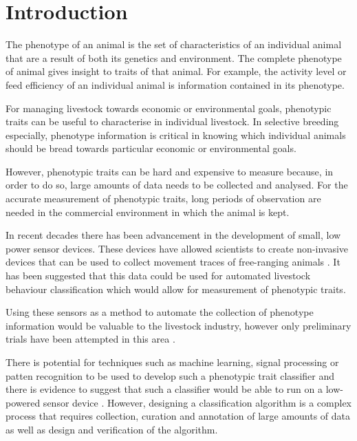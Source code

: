 \chapter{Introduction}

The phenotype of an animal is the set of characteristics of an individual animal that are a result of both its genetics and environment. The complete phenotype of animal gives insight to traits of that animal. For example, the activity level or feed efficiency of an individual animal is information contained in its phenotype. 

For managing livestock towards economic or environmental goals, phenotypic traits can be useful to characterise in individual livestock. In selective breeding especially, phenotype information is critical in knowing which individual animals should be bread towards particular economic or environmental goals. \cite{Pollak2012} \cite{Arthur}

However, phenotypic traits can be hard and expensive to measure because, in order to do so, large amounts of data needs to be collected and analysed. For the accurate measurement of phenotypic traits, long periods of observation are needed in the commercial environment in which the animal is kept. \cite{Falconer1996}

In recent decades there has been advancement in the development of small, low power sensor devices. These devices have allowed scientists to create non-invasive devices that can be used to collect movement traces of free-ranging animals \cite{Anthony2012}. It has been suggested that this data could be used for automated livestock behaviour classification \cite{Guo2006} which would allow for measurement of phenotypic traits. 

Using these sensors as a method to automate the collection of phenotype information would be valuable to the livestock industry, however only preliminary trials have been attempted in this area \cite{Guo2006}. 

There is potential for techniques such as machine learning, signal processing or patten recognition to be used to develop such a phenotypic trait classifier \cite{Guo2006} and there is evidence to suggest that such a classifier would be able to run on a low-powered sensor device \cite{predd2007distributed} \cite{stoeltingmachine}. However, designing a classification algorithm is a complex process that requires collection, curation and annotation of large amounts of data as well as design and verification of the algorithm. 

